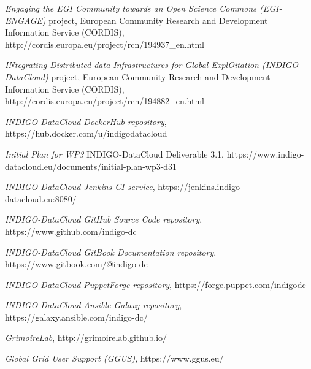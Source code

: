 \documentclass[journal]{IEEEtran}
\begin{document}
\begin{thebibliography}{1}
\emph{Engaging the EGI Community towards an Open Science Commons (EGI-ENGAGE)}
project, European Community Research and Development Information Service
(CORDIS), http://cordis.europa.eu/project/rcn/194937\_en.html

\emph{INtegrating Distributed data Infrastructures for Global ExplOitation
(INDIGO-DataCloud)} project, European Community Research and Development
Information Service (CORDIS),
http://cordis.europa.eu/project/rcn/194882\_en.html

\emph{INDIGO-DataCloud DockerHub repository},
https://hub.docker.com/u/indigodatacloud

\emph{Initial Plan for WP3} INDIGO-DataCloud Deliverable 3.1,
https://www.indigo-datacloud.eu/documents/initial-plan-wp3-d31

\emph{INDIGO-DataCloud Jenkins CI service},
https://jenkins.indigo-datacloud.eu:8080/

\emph{INDIGO-DataCloud GitHub Source Code repository},
https://www.github.com/indigo-dc

\emph{INDIGO-DataCloud GitBook Documentation repository},
https://www.gitbook.com/@indigo-dc

\emph{INDIGO-DataCloud PuppetForge repository},
https://forge.puppet.com/indigodc

\emph{INDIGO-DataCloud Ansible Galaxy repository},
https://galaxy.ansible.com/indigo-dc/

\emph{GrimoireLab}, http://grimoirelab.github.io/

\emph{Global Grid User Support (GGUS)}, https://www.ggus.eu/

\end{thebibliography}

%
\end{document}
